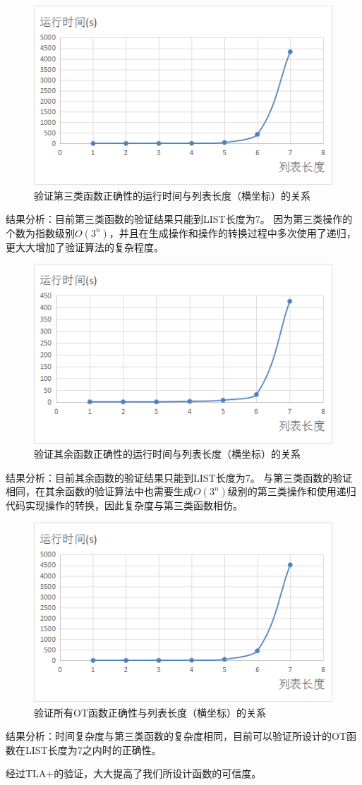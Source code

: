 \begin{figure}[H]
\centering
\includegraphics{figures/runtime3.bmp}
\caption{验证第三类函数正确性的运行时间与列表长度（横坐标）的关系}
\end{figure}
\par 结果分析：目前第三类函数的验证结果只能到LIST长度为7。
因为第三类操作的个数为指数级别$O(3^n)$，并且在生成操作和操作的转换过程中多次使用了递归，更大大增加了验证算法的复杂程度。

\begin{figure}[H]
\centering
\includegraphics{figures/runtime4.bmp}
\caption{验证其余函数正确性的运行时间与列表长度（横坐标）的关系}
\end{figure}
\par 结果分析：目前其余函数的验证结果只能到LIST长度为7。
与第三类函数的验证相同，在其余函数的验证算法中也需要生成$O(3^n)$级别的第三类操作和使用递归代码实现操作的转换，因此复杂度与第三类函数相仿。

\begin{figure}[H]
\centering
\includegraphics{figures/runtimeall.bmp}
\caption{验证所有OT函数正确性与列表长度（横坐标）的关系}
\end{figure}
\par 结果分析：时间复杂度与第三类函数的复杂度相同，目前可以验证所设计的OT函数在LIST长度为7之内时的正确性。

经过TLA+的验证，大大提高了我们所设计函数的可信度。